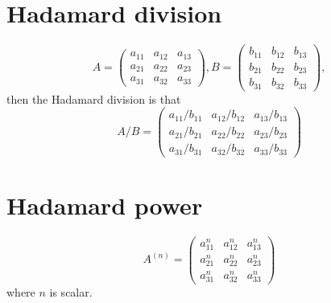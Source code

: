 \documentclass[dvipdfmx]{article}
\begin{document}
\section*{Hadamard division}
 \[
   A=
   \left(
   \begin{array}{ccc}
   a_{11} & a_{12} & a_{13} \\
   a_{21} & a_{22}  & a_{23} \\
   a_{31} & a_{32} & a_{33}
   \end{array}
   \right) ,
   B =
   \left(
   \begin{array}{ccc}
   b_{11} & b_{12} & b_{13} \\
   b_{21} & b_{22}  & b_{23} \\
   b_{31} & b_{32} & b_{33}
   \end{array}
   \right) ,
 \]
then the Hadamard division is that
 \[
   A / B=
   \left(
   \begin{array}{ccc}
   a_{11} / b_{11} & a_{12} / b_{12}  & a_{13} / b_{13} \\
   a_{21} / b_{21} & a_{22} / b_{22} & a_{23} / b_{23} \\
   a_{31} / b_{31} & a_{32} / b_{32} & a_{33} / b_{33}
   \end{array}
   \right) 
 \]


\section*{Hadamard power}
 \[
   A^{(n)}=
   \left(
   \begin{array}{ccc}
   a_{11}^n & a_{12}^n & a_{13}^n \\
   a_{21}^n & a_{22}^n  & a_{23}^n \\
   a_{31}^n & a_{32}^n & a_{33}^n
   \end{array}
   \right)
 \]
 where $n$ is scalar.
\end{document}
